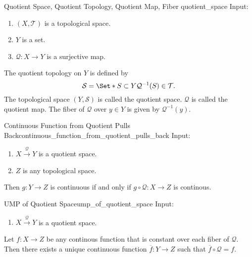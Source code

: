 \documentclass{article}
\begin{document}
\begin{definition}{Quotient Space, Quotient Topology, Quotient Map, Fiber }{quotient_space}
    Input:
    \begin{enumerate}
        \item $(X,\mathcal{T})$ is a topological space.
        \item $Y$ is a set.
        \item $\mathcal{Q}:X\rightarrow Y$ is a surjective map.
    \end{enumerate}
    The quotient topology on $Y$ is defined by
    \[ \mathcal{S} = \Set*{S\subset Y}{\mathcal{Q}^{-1}(S) \in \mathcal{T}}. \]
    The topological space $(Y,\mathcal{S})$ is called the quotient space.
    $\mathcal{Q}$ is called the quotient map. The fiber of $\mathcal{Q}$ over $y\in Y$ is given by $\mathcal{Q}^{-1}(y)$.
\end{definition}

\begin{lemma}{Continuous Function from Quotient Pulls Back}{continuous_function_from_quotient_pulls_back}
    Input:
    \begin{enumerate}
        \item $X\xrightarrow{\mathcal{Q}} Y$ is a quotient space.
        \item $Z$ is any topological space.
    \end{enumerate}
    Then $g:Y\rightarrow Z$ is continuous if and only if $g\circ \mathcal{Q}: X\rightarrow Z$ is continous.
\end{lemma}

\begin{lemma}{UMP of Quotient Space}{ump_of_quotient_space}
    Input:
    \begin{enumerate}
        \item $X\xrightarrow{\mathcal{Q}} Y$ is a quotient space.
    \end{enumerate}
    Let $f:X\rightarrow Z$ be any continous function that is constant over each fiber of $\mathcal{Q}$.
    Then there exists a unique continuous function $\overline{f}:Y\rightarrow Z$ such that $\overline{f}\circ\mathcal{Q} = f$.
    \begin{center}
    \end{center}
\end{lemma}
\end{document}
